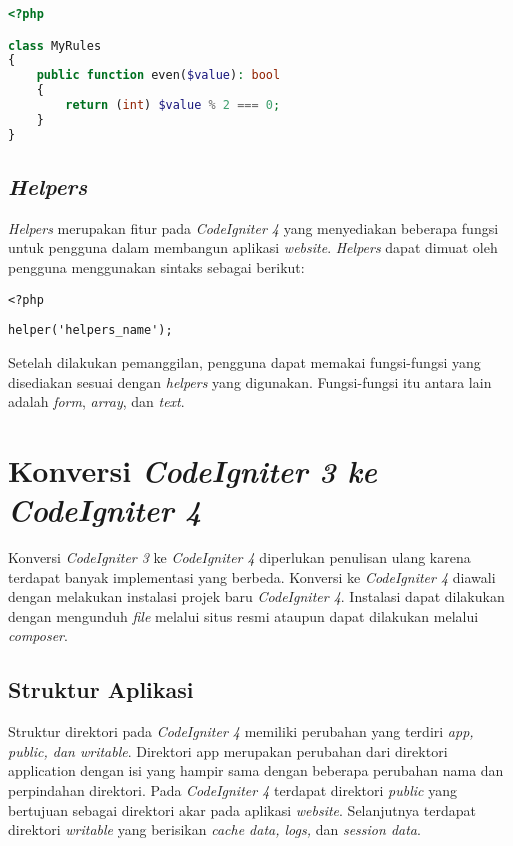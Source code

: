 \begin{lstlisting}[language=PHP, caption=Contoh kode pembentukan aturan secara manual pada \textit{file} \texttt{Validation.php}. ,label=kode:ci4validationrulesmanual]
<?php

class MyRules
{
    public function even($value): bool
    {
        return (int) $value % 2 === 0;
    }
}
\end{lstlisting}

\subsection{\textit{Helpers}}
\textit{Helpers} merupakan fitur pada \textit{CodeIgniter 4} yang menyediakan beberapa fungsi untuk pengguna dalam membangun aplikasi \textit{website}. \textit{Helpers} dapat dimuat oleh pengguna menggunakan sintaks sebagai berikut:

\begin{center}
\verb|<?php|

\verb|helper('helpers_name');|
\end{center}
Setelah dilakukan pemanggilan, pengguna dapat memakai fungsi-fungsi yang disediakan sesuai dengan \textit{helpers} yang digunakan. Fungsi-fungsi itu antara lain adalah \textit{form}, \textit{array}, dan \textit{text}.

\section{Konversi \textit{CodeIgniter 3 ke CodeIgniter 4}\cite{codeigniter:23:ci4}}
\label{sec:konversici3c4}
 
Konversi \textit{CodeIgniter 3} ke \textit{CodeIgniter 4} diperlukan penulisan ulang karena terdapat banyak implementasi yang berbeda. Konversi ke \textit{CodeIgniter 4} diawali dengan melakukan instalasi projek baru \textit{CodeIgniter 4}. Instalasi dapat dilakukan dengan mengunduh \textit{file} melalui situs resmi ataupun dapat dilakukan melalui \textit{composer}.


\subsection{Struktur Aplikasi}

Struktur direktori pada \textit{CodeIgniter 4} memiliki perubahan yang terdiri \textit{app, public, dan writable}. Direktori app merupakan perubahan dari direktori application dengan isi yang hampir sama dengan beberapa perubahan nama dan perpindahan direktori. Pada \textit{CodeIgniter 4} terdapat direktori \textit{public} yang bertujuan sebagai direktori akar pada aplikasi \textit{website}. Selanjutnya terdapat direktori \textit{writable} yang berisikan \textit{cache data, logs,} dan \textit{session data}.

